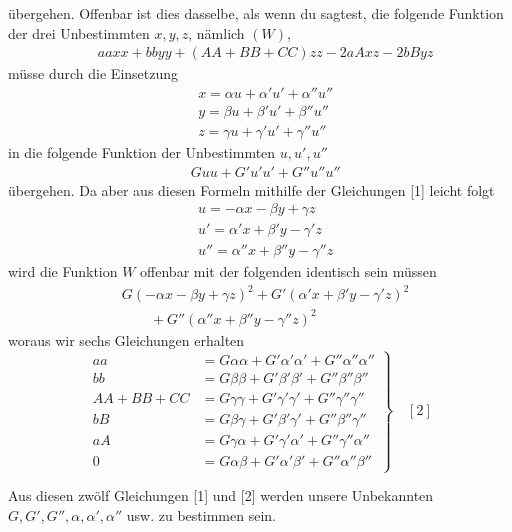 übergehen. 
Offenbar ist dies dasselbe, als wenn du sagtest, die folgende Funktion der drei Unbestimmten $x,y,z$, nämlich $(W)$,
\[
\begin{aligned}
&aaxx+bbyy+(AA+BB+CC)zz-2aAxz-2bByz
\end{aligned}
\]
müsse durch die Einsetzung
\[
\begin{aligned}
&x=\alpha u+\alpha'u'+\alpha''u''\\[6pt]
&y=\beta u+\beta'u'+\beta''u''\\[6pt]
&z=\gamma u+\gamma'u'+\gamma''u''
\end{aligned}
\]
in die folgende Funktion der Unbestimmten $u,u',u''$
\[
\begin{aligned}
&Guu+G'u'u'+G''u''u''
\end{aligned}
\]
übergehen. 
Da aber aus diesen Formeln mithilfe der Gleichungen [1] leicht folgt
\[
\begin{aligned}
&u=-\alpha x-\beta y+\gamma z\\[6pt]
&u'=\alpha'x+\beta'y-\gamma'z\\[6pt]
&u''=\alpha''x+\beta''y-\gamma''z
\end{aligned}
\]
wird die Funktion $W$ offenbar mit der folgenden identisch sein müssen
\[
\begin{aligned}
&G(-\alpha x-\beta y+\gamma z)^2
+G'(\alpha'x+\beta'y-\gamma'z)^2
\\[6pt]
&\qquad{}+G''(\alpha''x+\beta''y-\gamma''z)^2
\end{aligned}
\]
woraus wir sechs Gleichungen erhalten
\[
\left.
\begin{aligned}
aa&=G\alpha\alpha+G'\alpha'\alpha'+G''\alpha''\alpha''\\[5pt]
bb&=G\beta\beta+G'\beta'\beta'+G''\beta''\beta''\\[5pt]
AA+BB+CC&=G\gamma\gamma+G'\gamma'\gamma'+G''\gamma''\gamma''\\[5pt]
bB&=G\beta\gamma+G'\beta'\gamma'+G''\beta''\gamma''\\[5pt]
aA&=G\gamma\alpha+G'\gamma'\alpha'+G''\gamma''\alpha''\\[5pt]
0&=G\alpha\beta+G'\alpha'\beta'+G''\alpha''\beta''
\end{aligned}
\right\}\quad [2]
\]

Aus diesen zwölf Gleichungen [1] und [2] werden unsere Unbekannten $G,\allowbreak G',\allowbreak G'',\allowbreak \alpha,\allowbreak \alpha',\allowbreak \alpha''$ usw. zu bestimmen sein.

